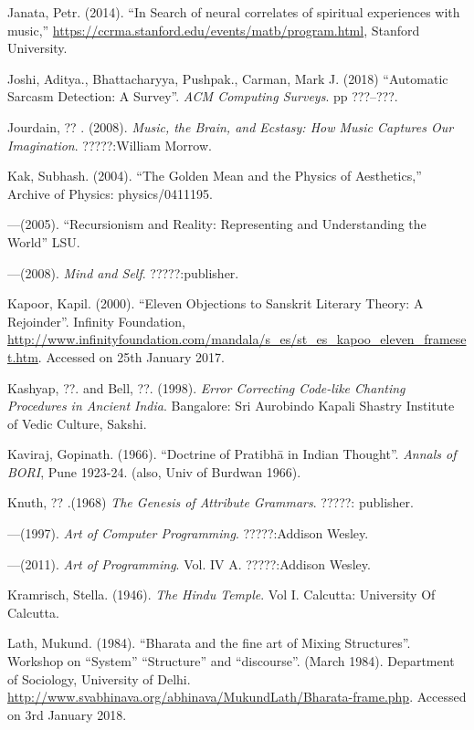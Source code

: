 \begin{thebibliography}{99}
Janata, Petr. (2014). “In Search of neural correlates of spiritual experiences with music,” \url{https://ccrma.stanford.edu/events/matb/program.html}, Stanford University.

Joshi, Aditya., Bhattacharyya, Pushpak., Carman, Mark J. (2018) “Automatic Sarcasm Detection: A Survey”. \textsl{ACM Computing Surveys}. pp ???--???.

Jourdain, ?? . (2008). \textsl{Music, the Brain, and Ecstasy: How Music Captures Our Imagination}. ?????:William Morrow.

Kak, Subhash. (2004). “The Golden Mean and the Physics of Aesthetics,” Archive of Physics: physics/0411195.

---\kern3pt(2005). “Recursionism and Reality: Representing and Understanding the World” LSU.

---\kern3pt(2008). \textsl{Mind and Self}. ?????:publisher.

Kapoor, Kapil. (2000). “Eleven Objections to Sanskrit Literary Theory: A Rejoinder”. Infinity Foundation, \url{http://www.infinityfoundation.com/mandala/s_es/st_es_kapoo_eleven_frameset.htm}. Accessed on 25th January 2017.

Kashyap, ??. and Bell, ??. (1998). \textsl{Error Correcting Code-like Chanting Procedures in Ancient India}. Bangalore: Sri Aurobindo Kapali Shastry Institute of Vedic Culture, Sakshi.

Kaviraj, Gopinath. (1966). “Doctrine of Pratibhā in Indian Thought”. \textsl{Annals of BORI}, Pune 1923-24. (also, Univ of Burdwan 1966).

Knuth, ?? .(1968) \textsl{The Genesis of Attribute Grammars}. ?????: publisher.

---\kern3pt(1997). \textsl{Art of Computer Programming}. ?????:Addison Wesley.

---\kern3pt(2011). \textsl{Art of Programming}. Vol. IV A. ?????:Addison Wesley.

Kramrisch, Stella. (1946). \textsl{The Hindu Temple}. Vol I. Calcutta: University Of Calcutta.

Lath, Mukund. (1984). “Bharata and the fine art of Mixing Structures”. Workshop on “System” “Structure” and “discourse”. (March 1984). Department of Sociology, University of Delhi. \url{http://www.svabhinava.org/abhinava/MukundLath/Bharata-frame.php}. Accessed on 3rd January 2018.


\end{thebibliography}
